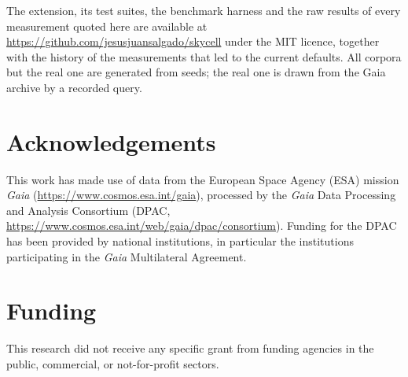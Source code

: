 \documentclass[preprint,12pt]{elsarticle}
\begin{document}
The extension, its test suites, the benchmark harness and the raw results of every
measurement quoted here are available at
\url{https://github.com/jesusjuansalgado/skycell} under the MIT licence, together with
the history of the measurements that led to the current defaults. All corpora but the
real one are generated from seeds; the real one is drawn from the Gaia archive by a
recorded query.

\section*{Acknowledgements}

This work has made use of data from the European Space Agency (ESA) mission \emph{Gaia}
(\url{https://www.cosmos.esa.int/gaia}), processed by the \emph{Gaia} Data Processing and
Analysis Consortium (DPAC, \url{https://www.cosmos.esa.int/web/gaia/dpac/consortium}).
Funding for the DPAC has been provided by national institutions, in particular the
institutions participating in the \emph{Gaia} Multilateral Agreement.

\section*{Funding}

This research did not receive any specific grant from funding agencies in the public,
commercial, or not-for-profit sectors.


\end{document}
